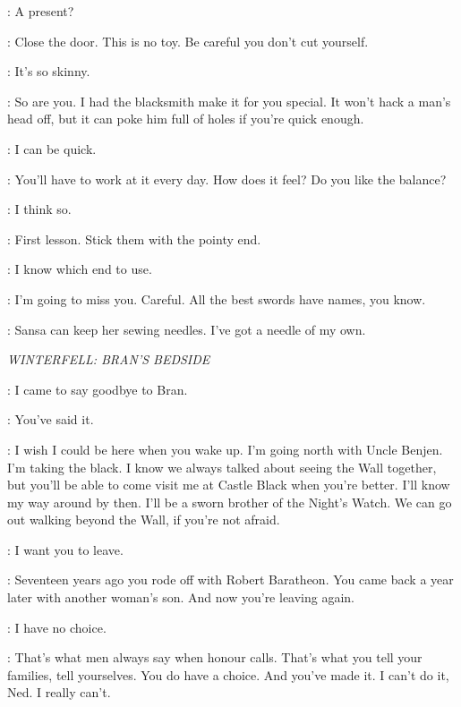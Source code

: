 \ARYA: A present? 

\JON: Close the door.  This is no toy. Be careful you don't cut yourself. 

\ARYA: It's so skinny. 

\JON: So are you. I had the blacksmith make it for you special. It won't hack a man's head off, but it can poke him full of holes if you're quick enough. 

\ARYA: I can be quick. 

\JON: You'll have to work at it every day. How does it feel? Do you like the balance? 

\ARYA: I think so. 

\JON: First lesson. Stick them with the pointy end. 

\ARYA: I know which end to use. 

\JON: I'm going to miss you.  Careful.  All the best swords have names, you know. 

\ARYA: Sansa can keep her sewing needles. I've got a needle of my own. 

\scene

\textit{WINTERFELL: BRAN'S BEDSIDE}


\JON: I came to say goodbye to Bran. 

\CATELYN: You've said it. 

\JON: I wish I could be here when you wake up. I'm going north with Uncle Benjen. I'm taking the black. I know we always talked about seeing the Wall together, but you'll be able to come visit me at Castle Black when you're better. I'll know my way around by then. I'll be a sworn brother of the Night's Watch. We can go out walking beyond the Wall, if you're not afraid. 


\CATELYN: I want you to leave. 


\CATELYN: Seventeen years ago you rode off with Robert Baratheon. You came back a year later with another woman's son. And now you're leaving again. 

\NED: I have no choice. 

\CATELYN: That's what men always say when honour calls. That's what you tell your families, tell yourselves. You do have a choice. And you've made it. I can't do it, Ned. I really can't. 

